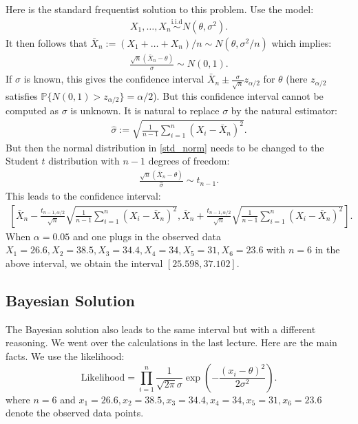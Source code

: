 \documentclass{scrartcl}
\newcommand{\P}{{\mathbb P}}
\begin{document}
Here is the standard frequentist solution to this problem. Use the model:
\begin{align}
  \label{norm_iid}
  X_1, \dots, X_n \overset{\text{i.i.d}}{\sim} N(\theta, \sigma^2). 
\end{align}
It then follows that $\bar{X}_n := (X_1 + \dots + X_n)/n \sim
N(\theta, \sigma^2/n)$ which implies:
\begin{align}\label{std_norm}
  \frac{\sqrt{n}(\bar{X}_n - \theta)}{\sigma} \sim N(0, 1). 
\end{align}
If $\sigma$ is known, this gives the confidence interval $\bar{X}_n
\pm \frac{\sigma}{\sqrt{n}} z_{\alpha/2}$ for $\theta$ (here
$z_{\alpha/2}$ satisfies $\P\{N(0, 1) > z_{\alpha/2}\} =
\alpha/2$). But this confidence interval cannot be computed as
$\sigma$ is unknown. It is natural to replace $\sigma$ by the natural
estimator: 
\begin{align*}
  \hat{\sigma} := \sqrt{\frac{1}{n-1} \sum_{i=1}^n (X_i -
  \bar{X}_n)^2}. 
\end{align*}
But then the normal distribution in \eqref{std_norm} needs to be
changed to the Student $t$ distribution with $n-1$ degrees of freedom:
\begin{align}\label{std_t}
  \frac{\sqrt{n}(\bar{X}_n - \theta)}{\hat{\sigma}} \sim t_{n-1}. 
\end{align}
This leads to the confidence interval:
\begin{align}\label{freq_ci}
\left[  \bar{X}_n - \frac{t_{n-1,
      \alpha/2}}{\sqrt{n}}  
  \sqrt{\frac{1}{n-1} \sum_{i=1}^n (X_i - \bar{X}_n)^2}, 
  \bar{X}_n + \frac{t_{n-1,
      \alpha/2}}{\sqrt{n}}  
  \sqrt{\frac{1}{n-1} \sum_{i=1}^n (X_i - \bar{X}_n)^2}  \right]. 
\end{align}
When $\alpha = 0.05$ and one plugs in the observed data $X_1 = 26.6,
X_2 = 38.5, X_3 = 34.4, X_4 = 34, X_5 = 31, X_6 = 23.6$ with $n = 6$
in the above interval, we obtain the interval $[25.598, 37.102]$. 

\subsection{Bayesian Solution}
The Bayesian solution also leads to the same interval but with a
different reasoning. We went over the 
calculations in the last lecture. Here are the main facts. We use the
likelihood:  
\begin{equation}\label{likeli_4}
\text{Likelihood} = \prod_{i=1}^n \frac{1}{\sqrt{2 \pi} \sigma} \exp
\left(-\frac{(x_i - 
      \theta)^2}{2 \sigma^2} \right). 
\end{equation}
where $n = 6$ and $x_1 = 26.6, x_2 = 38.5, x_3 = 34.4,
  x_4 = 34, x_5 = 31, x_6 = 23.6$ denote the observed data
  points.
\end{document}
